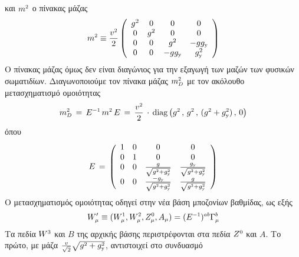 και $m\superscr{2}$ ο πίνακας μάζας
\begin{equation}
    m\superscr{2}\equiv\frac{v\superscr{2}}{2}\left(\begin{array}{cccc}
        g^2 & 0 & 0 & 0 \\
        0 & g^2 & 0 & 0 \\
        0 & 0 & g^2 & -gg\subscr{\y} \\
        0 & 0 & -gg\subscr{\y} & g\subscr{\y}^2
    \end{array}\right)
 \end{equation}
Ο πίνακας μάζας όμως δεν είναι διαγώνιος για την εξαγωγή των μαζών των φυσικών σωματιδίων. Διαγωνοποιούμε τον πίνακα μάζας $m\subscr{D}\superscr{2}$ με τον ακόλουθο μετασχηματισμό ομοιότητας 
\begin{equation}\label{diagonal mass matrix}
    m\superscr{2}\subscr{D}\,=\,E\superscr{-1}\,m\superscr{2}\,E\,=\,\frac{v\superscr{2}}{2}\,\cdot\,\text{diag}\left(g\superscr{2}\,,\,g\superscr{2}\,,\,(g\superscr{2}+g\subscr{\y}\superscr{2})\,,\,0\right)
\end{equation}
όπου 
\begin{equation}
    E \,=\, \left( \begin{array}{cccc}
         1 & 0 & 0 & 0 \\
         0 & 1 & 0 & 0 \\
         0 & 0 & \frac{g}{\sqrt{g\superscr{2}+g\subscr{\y}\superscr{2}}} & \frac{g\subscr{\y}}{\sqrt{g\superscr{2}+g\subscr{\y}\superscr{2}}}\\
         0 & 0 & \frac{-g\subscr{\y}}{\sqrt{g\superscr{2}+g\subscr{\y}\superscr{2}}} & \frac{g}{\sqrt{g\superscr{2}+g\subscr{\y}\superscr{2}}}
    \end{array} \right)
\end{equation}
Ο μετασχηματισμός ομοιότητας οδηγεί στην νέα βάση μποζονίων βαθμίδας, ως εξής 
\begin{equation}
    W\subscr{\mu}'\equiv (W\superscr{1}\subscr{\mu},W\superscr{2}\subscr{\mu},Z\superscr{0}\subscr{\mu},A\subscr{\mu}) = (E\superscr{-1})\superscr{ab}\Gamma\superscr{b}\subscr{\mu}
\end{equation}
Τα πεδία $W\superscr{3}$ και $B$ της αρχικής βάσης περιστρέφονται 
στα πεδία $Z\superscr{0}$ και $A$. Το πρώτο, με μάζα $\frac{v}{\sqrt{2}}\sqrt{g\superscr{2}+g\subscr{\y}\superscr{2}}$, αντιστοιχεί στο συνδυασμό
